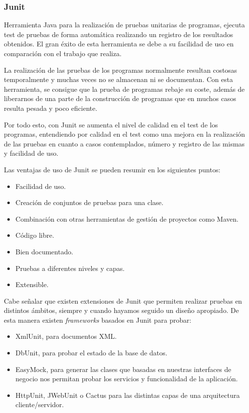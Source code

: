 \subsubsection{Junit}\label{junit}
Herramienta Java para la realización de pruebas unitarias de
programas, ejecuta test de pruebas de forma automática realizando un registro de
los resultados obtenidos. El gran éxito de esta herramienta se debe a su
facilidad de uso en comparación con el trabajo que realiza.

La realización de las pruebas de los programas normalmente resultan costosas
temporalmente y muchas veces no se almacenan ni se documentan. Con esta
herramienta, se consigue que la prueba de programas rebaje su coste, además de
liberarnos de una parte de la construcción de programas que en muchos casos
resulta pesada y poco eficiente.

Por todo esto, con Junit se aumenta el nivel de calidad en el test de los programas,
entendiendo por calidad en el test como una mejora en la realización de
las pruebas en cuanto a casos contemplados, número y registro de las mismas y facilidad de uso.

Las ventajas de uso de Junit se pueden resumir en los siguientes puntos:
\begin{itemize}
\item Facilidad de uso.
\item  Creación de conjuntos de pruebas para una clase.
\item  Combinación con otras herramientas de gestión de proyectos como Maven.
\item  Código libre.
\item  Bien documentado.
\item  Pruebas a diferentes niveles y capas.
\item  Extensible.
\end{itemize}

Cabe señalar que existen extensiones de Junit que permiten realizar pruebas en
distintos ámbitos, siempre y cuando hayamos seguido un diseño apropiado. 
De esta manera existen \textit{frameworks} basados en Junit para probar:
\begin{itemize}
\item  XmlUnit, para documentos XML.
\item  DbUnit, para probar el estado de la base de datos.
\item  EasyMock, para generar las clases que basadas en nuestras interfaces de
negocio nos permitan probar los servicios y funcionalidad de la aplicación.
\item  HttpUnit, JWebUnit o Cactus para las distintas capas de
una arquitectura cliente/servidor.
\end{itemize}

